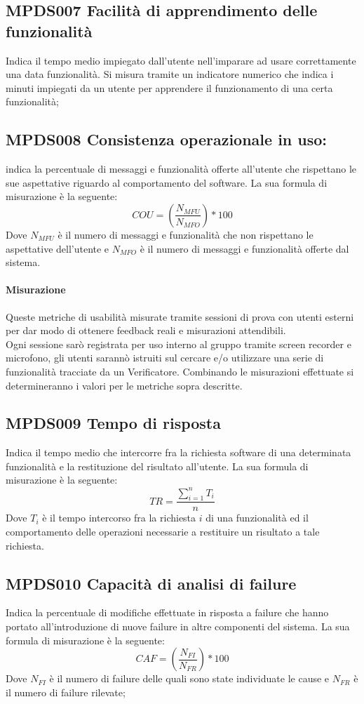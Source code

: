 \documentclass[NormeDiProgetto.tex]{subfiles}
\begin{document}
\subsection{MPDS007 Facilità di apprendimento delle funzionalità} Indica il tempo medio impiegato dall'utente nell'imparare ad usare correttamente una data funzionalità. Si misura tramite un indicatore numerico che indica i minuti impiegati da un utente per apprendere il funzionamento di una certa funzionalità;
\subsection{MPDS008 Consistenza operazionale in uso:} indica la percentuale di messaggi e funzionalità offerte all'utente che rispettano le sue aspettative riguardo al comportamento del software. La sua formula di misurazione è la seguente: \[COU=(\frac{N_{MFU}}{N_{MFO}})*100\] Dove $ N_{MFU} $ è il numero di messaggi e funzionalità che non rispettano le aspettative dell'utente e $ N_{MFO} $ è il numero di messaggi e funzionalità offerte dal sistema.	
	
	\paragraph{Misurazione}
	Queste metriche di usabilità misurate tramite sessioni di prova con utenti esterni per dar modo di ottenere feedback reali e misurazioni attendibili.\\ Ogni sessione sarò registrata per uso interno al gruppo tramite screen recorder e microfono, gli utenti sarannò istruiti sul cercare e/o utilizzare una serie di funzionalità tracciate da un Verificatore.
	Combinando le misurazioni effettuate si determineranno i valori per le metriche sopra descritte.
	

\subsection{MPDS009 Tempo di risposta} Indica il tempo medio che intercorre fra la richiesta software di una determinata funzionalità e la restituzione del risultato all'utente. La sua formula di misurazione è la seguente: \[TR=\frac{\sum_{i=1}^n T_i}{n}\] Dove $ T_i $ è il tempo intercorso fra la richiesta $ i $ di una funzionalità ed il comportamento delle operazioni necessarie a restituire un risultato a tale richiesta.	

\subsection{MPDS010 Capacità di analisi di failure} Indica la percentuale di modifiche effettuate in risposta a failure che hanno portato all'introduzione di nuove failure in altre componenti del sistema. La sua formula di misurazione è la seguente: \[CAF=(\frac{N_{FI}}{N_{FR}})*100\] Dove $ N_{FI} $ è il numero di failure delle quali sono state individuate le cause e $ N_{FR} $ è il numero di failure rilevate;
\end{document}
